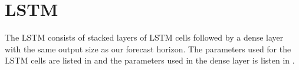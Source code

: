 \section{LSTM}
\label{section:Method:LSTM}




The LSTM consists of stacked layers of LSTM cells followed by a
dense layer with the same output size as our forecast horizon.
The parameters used for the LSTM cells are listed in 
and the parameters used in the dense layer is listen in .

